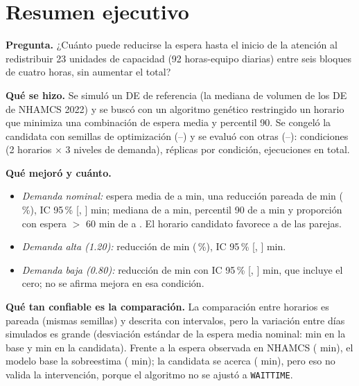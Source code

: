 \section*{Resumen ejecutivo}

\textbf{Pregunta.} ¿Cuánto puede reducirse la espera hasta el inicio de la atención al
redistribuir 23 unidades de capacidad (92 horas-equipo diarias) entre seis bloques de
cuatro horas, sin aumentar el total?

\textbf{Qué se hizo.} Se simuló un DE de referencia (la mediana de volumen de los DE de
NHAMCS 2022) y se buscó con un algoritmo genético restringido un horario que minimiza una
combinación de espera media y percentil 90. Se congeló la candidata con semillas de
optimización (\OptSeedFirst--\OptSeedLast) y se evaluó con otras
(\EvalSeedFirst--\EvalSeedLast): \NConditions{} condiciones (2 horarios $\times$ 3 niveles
de demanda), \NReps{} réplicas por condición, \NRuns{} ejecuciones en total.

\textbf{Qué mejoró y cuánto.}
\begin{itemize}
  \item \emph{Demanda nominal:} espera media de \WaitBaseNom{} a \WaitCandNom{} min,
  una reducción pareada de \RedNom{} min (\RedPctNom\,\%), IC 95\,\% [\RedCILowNom,
  \RedCIHighNom] min; mediana de \NomBaseMedian{} a \NomCandMedian{} min, percentil 90 de
  \NomBasePninety{} a \NomCandPninety{} min y proporción con espera $>$ 60 min de
  \NomBaseShare{} a \NomCandShare{}. El horario candidato favorece a \PairsPosNom{} de
  las \NReps{} parejas.
  \item \emph{Demanda alta (1.20):} reducción de \RedHigh{} min (\RedPctHigh\,\%), IC 95\,\%
  [\RedCILowHigh, \RedCIHighHigh] min.
  \item \emph{Demanda baja (0.80):} reducción de \RedLow{} min con IC 95\,\% [\RedCILowLow,
  \RedCIHighLow] min, que incluye el cero; no se afirma mejora en esa condición.
\end{itemize}

\textbf{Qué tan confiable es la comparación.} La comparación entre horarios es pareada
(mismas semillas) y descrita con intervalos, pero la variación entre días simulados es
grande (desviación estándar de la espera media nominal: \StdBaseNom{} min en la base y
\StdCandNom{} min en la candidata). Frente a la espera observada en NHAMCS
(\RefMeanWait{} min), el modelo base la sobreestima (\WaitBaseNom{} min); la candidata se
acerca (\WaitCandNom{} min), pero eso no valida la intervención, porque el algoritmo no se
ajustó a \texttt{WAITTIME}.

